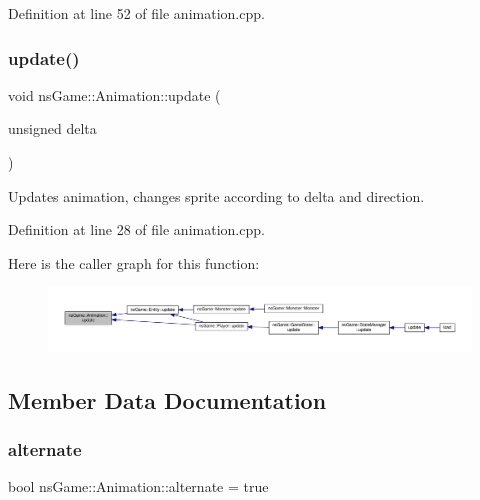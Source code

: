 Definition at line 52 of file animation.\+cpp.

\mbox{\label{classns_game_1_1_animation_a5f32b1fc6ad5d228a4153d7421fa457b}} 
\subsubsection{\texorpdfstring{update()}{update()}}
{\footnotesize\ttfamily void ns\+Game\+::\+Animation\+::update (\begin{DoxyParamCaption}\item[{unsigned}]{delta }\end{DoxyParamCaption})}



Updates animation, changes sprite according to delta and direction. 



Definition at line 28 of file animation.\+cpp.

Here is the caller graph for this function\+:\nopagebreak
\begin{figure}[H]
\begin{center}
\leavevmode
\includegraphics[width=350pt]{classns_game_1_1_animation_a5f32b1fc6ad5d228a4153d7421fa457b_icgraph}
\end{center}
\end{figure}


\subsection{Member Data Documentation}
\mbox{\label{classns_game_1_1_animation_a3f119a84e6993f0676c9cde2b84a61dd}} 
\subsubsection{\texorpdfstring{alternate}{alternate}}
{\footnotesize\ttfamily bool ns\+Game\+::\+Animation\+::alternate = true}




